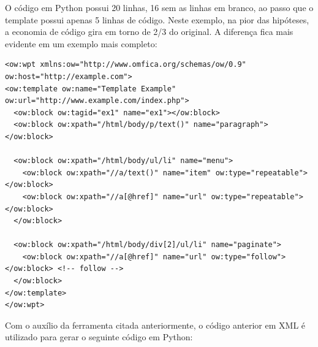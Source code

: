 O código em Python possui 20 linhas, 16 sem as linhas em branco, ao passo que o template possui apenas 5 linhas de código. Neste exemplo, na pior das hipóteses, a economia de código gira em torno de 2/3 do original. A diferença fica mais evidente em um exemplo mais completo:

\begin{lstlisting}
<ow:wpt xmlns:ow="http://www.omfica.org/schemas/ow/0.9"
ow:host="http://example.com">
<ow:template ow:name="Template Example" ow:url="http://www.example.com/index.php">
  <ow:block ow:tagid="ex1" name="ex1"></ow:block>
  <ow:block ow:xpath="/html/body/p/text()" name="paragraph"></ow:block>
  
  <ow:block ow:xpath="/html/body/ul/li" name="menu">
    <ow:block ow:xpath="//a/text()" name="item" ow:type="repeatable"></ow:block>
    <ow:block ow:xpath="//a[@href]" name="url" ow:type="repeatable"></ow:block>
  </ow:block>
  
  <ow:block ow:xpath="/html/body/div[2]/ul/li" name="paginate">
    <ow:block ow:xpath="//a[@href]" name="url" ow:type="follow"></ow:block> <!-- follow -->
  </ow:block>
</ow:template> 
</ow:wpt>
\end{lstlisting}

Com o auxílio da ferramenta citada anteriormente, o código anterior em XML é utilizado para gerar o seguinte código em Python: 

